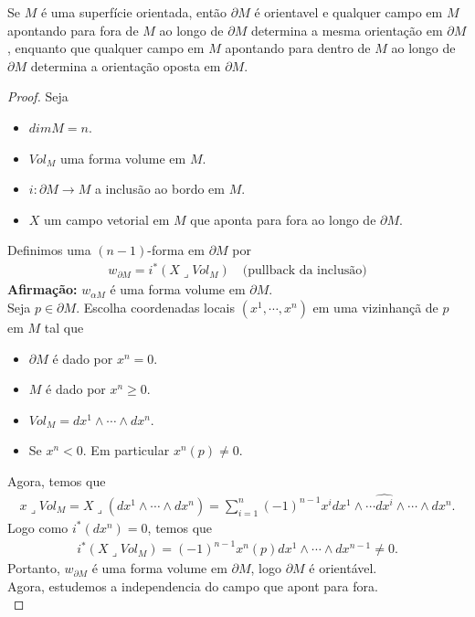 \begin{theorem}
  Se $M$ é uma superfície orientada, então $\partial M$ é orientavel e qualquer campo em $M$ apontando para fora de $M$ ao longo de $\partial M$ determina a mesma orientação em $\partial M$, enquanto que qualquer campo em $M$ apontando para dentro de $M$ ao longo de $\partial M$ determina a orientação oposta em $\partial M$. 
\end{theorem}
\begin{proof} 
  Seja
  \begin{itemize}
    \item $dim M=n$.
    \item $Vol_M$ uma forma volume em $M$.
    \item $i:\partial M\to M$ a inclusão ao bordo em $M$.
    \item $X$ um campo vetorial em $M$ que aponta para fora ao longo de $\partial M$. 
  \end{itemize}
  Definimos uma $(n-1)$-forma em $\partial M$ por
  \begin{align*}
    w_{\partial M}=i^{\ast}(X\lrcorner Vol_M)\quad \text{(pullback da inclusão)}
  \end{align*}
  \textbf{Afirmação:} $w_{\alpha M}$ é uma forma volume em $\partial M$.\\
  Seja $p\in\partial M$. Escolha coordenadas locais $(x^{1},\cdots,x^{n})$ em uma vizinhançã de $p$ em $M$ tal que
  \begin{itemize}
    \item $\partial M$ é dado por $x^{n}=0$.
    \item $M$ é dado por $x^{n}\geq 0$.
    \item $Vol_M=dx^1\wedge\cdots\wedge dx^{n}$.
    \item Se $x^{n}<0$. Em particular $x^{n}(p)\neq 0$.
  \end{itemize}
  Agora, temos que
  \begin{align*}
    x\lrcorner Vol_M=X\lrcorner (dx^{1}\wedge\cdots\wedge dx^{n})=\sum_{i=1}^{n}(-1)^{n-1}x^{i}dx^{1}\wedge\cdots\hat{dx^{i}}\wedge\cdots\wedge dx^{n}.
  \end{align*}
  Logo como $i^{\ast}(dx^{n})=0$, temos que
  \begin{align*}
    i^{\ast}(X\lrcorner Vol_M)=(-1)^{n-1}x^{n}(p)dx^{1}\wedge\cdots\wedge dx^{n-1}\neq 0.
  \end{align*}
  Portanto, $w_{\partial M}$ é uma forma volume em $\partial M$, logo $\partial M$ é orientável.\\
  Agora, estudemos a independencia do campo que apont para fora.\\

\end{proof}
